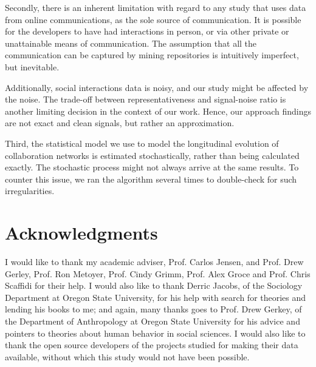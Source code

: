 \documentclass[12pt,letterpaper]{gthesis2}  %
\begin{document}
Secondly, there is an inherent limitation with regard to any study that uses data from online communications, as the sole source of communication. It is possible for the developers to have had interactions in person, or via other private or unattainable means of communication. The assumption that all the communication can be captured by mining repositories is intuitively imperfect, but inevitable.

Additionally, social interactions data is noisy, and our study might be affected by the noise. The trade-off between representativeness and signal-noise ratio is another limiting decision in the context of our work. Hence, our approach findings are not exact and clean signals, but rather an approximation.

Third, the statistical model we use to model the longitudinal evolution of collaboration networks is estimated stochastically, rather than being calculated exactly. The stochastic process might not always arrive at the same results. To counter this issue, we ran the algorithm several times to double-check for such irregularities.


\section*{Acknowledgments}
\label{acknowledgments}
I would like to thank my academic adviser, Prof. Carlos Jensen, and Prof. Drew Gerley, Prof. Ron Metoyer, Prof. Cindy Grimm, Prof. Alex Groce and Prof. Chris Scaffidi for their help. I would also like to thank Derric Jacobs, of the Sociology Department at Oregon State University, for his help with search for theories and lending his books to me; and again, many thanks goes to Prof. Drew Gerkey, of the Department of Anthropology at Oregon State University for his advice and pointers to theories about human behavior in social sciences. I would also like to thank the open source developers of the projects studied for making their data available, without which this study would not have been possible. \\

%

\pagebreak
\end{document}
